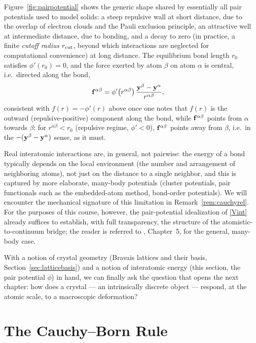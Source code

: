 Figure~\ref{fig:pairpotential} shows the generic shape shared by essentially all pair potentials used to model solids: a steep repulsive wall at short distance, due to the overlap of electron clouds and the Pauli exclusion principle, an attractive well at intermediate distance, due to bonding, and a decay to zero (in practice, a finite \textit{cutoff radius} $r_{\rm cut}$, beyond which interactions are neglected for computational convenience) at long distance. The equilibrium bond length $r_0$ satisfies $\phi'(r_0)=0$, and the force exerted by atom $\beta$ on atom $\alpha$ is central, i.e.\ directed along the bond,
\begin{equation}
	\mathbf{f}^{\alpha\beta} = \phi'\!\left(r^{\alpha\beta}\right)\frac{\mathbf{y}^{\beta}-\mathbf{y}^{\alpha}}{r^{\alpha\beta}},
\end{equation}
consistent with $f(r)=-\phi'(r)$ above once one notes that $f(r)$ is the outward (repulsive-positive) component along the bond, while $\mathbf{f}^{\alpha\beta}$ points from $\alpha$ towards $\beta$: for $r^{\alpha\beta}<r_0$ (repulsive regime, $\phi'<0$), $\mathbf{f}^{\alpha\beta}$ points away from $\beta$, i.e.\ in the $-(\mathbf{y}^\beta-\mathbf{y}^\alpha)$ sense, as it must.

\begin{remark}
	Real interatomic interactions are, in general, not pairwise: the energy of a bond typically depends on the local environment (the number and arrangement of neighboring atoms), not just on the distance to a single neighbor, and this is captured by more elaborate, many-body potentials (cluster potentials, pair functionals such as the embedded-atom method, bond-order potentials). We will encounter the mechanical signature of this limitation in Remark~\ref{rem:cauchyrel}. For the purposes of this course, however, the pair-potential idealization of \eqref{Vint} already suffices to establish, with full transparency, the structure of the atomistic-to-continuum bridge; the reader is referred to \cite{TadmorMiller}, Chapter~5, for the general, many-body case.
\end{remark}

With a notion of crystal geometry (Bravais lattices and their basis, Section~\ref{sec:latticebasis}) and a notion of interatomic energy (this section, the pair potential $\phi$) in hand, we can finally ask the question that opens the next chapter: how does a crystal --- an intrinsically discrete object --- respond, at the atomic scale, to a macroscopic deformation?

\chapter{The Cauchy--Born Rule}\label{CBrule}

